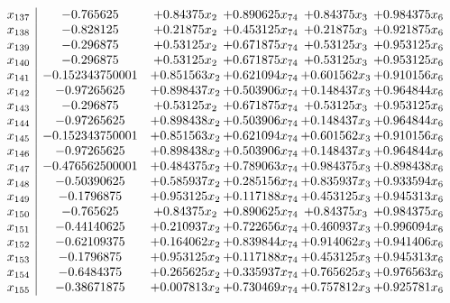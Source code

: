 \documentclass[11pt]{article}
\begin{document}
\[\begin{array}{c| c c@{\hskip 2pt} c@{\hskip 2pt} c@{\hskip 2pt} c@{\hskip 2pt} }
 x_{137}   &  -0.765625 & + 0.84375 x_{2} & + 0.890625 x_{74} & + 0.84375 x_{3} & + 0.984375 x_{6}\\
 x_{138}   &  -0.828125 & + 0.21875 x_{2} & + 0.453125 x_{74} & + 0.21875 x_{3} & + 0.921875 x_{6}\\
 x_{139}   &  -0.296875 & + 0.53125 x_{2} & + 0.671875 x_{74} & + 0.53125 x_{3} & + 0.953125 x_{6}\\
 x_{140}   &  -0.296875 & + 0.53125 x_{2} & + 0.671875 x_{74} & + 0.53125 x_{3} & + 0.953125 x_{6}\\
 x_{141}   &  -0.152343750001 & + 0.851563 x_{2} & + 0.621094 x_{74} & + 0.601562 x_{3} & + 0.910156 x_{6}\\
 x_{142}   &  -0.97265625 & + 0.898437 x_{2} & + 0.503906 x_{74} & + 0.148437 x_{3} & + 0.964844 x_{6}\\
 x_{143}   &  -0.296875 & + 0.53125 x_{2} & + 0.671875 x_{74} & + 0.53125 x_{3} & + 0.953125 x_{6}\\
 x_{144}   &  -0.97265625 & + 0.898438 x_{2} & + 0.503906 x_{74} & + 0.148437 x_{3} & + 0.964844 x_{6}\\
 x_{145}   &  -0.152343750001 & + 0.851563 x_{2} & + 0.621094 x_{74} & + 0.601562 x_{3} & + 0.910156 x_{6}\\
 x_{146}   &  -0.97265625 & + 0.898438 x_{2} & + 0.503906 x_{74} & + 0.148437 x_{3} & + 0.964844 x_{6}\\
 x_{147}   &  -0.476562500001 & + 0.484375 x_{2} & + 0.789063 x_{74} & + 0.984375 x_{3} & + 0.898438 x_{6}\\
 x_{148}   &  -0.50390625 & + 0.585937 x_{2} & + 0.285156 x_{74} & + 0.835937 x_{3} & + 0.933594 x_{6}\\
 x_{149}   &  -0.1796875 & + 0.953125 x_{2} & + 0.117188 x_{74} & + 0.453125 x_{3} & + 0.945313 x_{6}\\
 x_{150}   &  -0.765625 & + 0.84375 x_{2} & + 0.890625 x_{74} & + 0.84375 x_{3} & + 0.984375 x_{6}\\
 x_{151}   &  -0.44140625 & + 0.210937 x_{2} & + 0.722656 x_{74} & + 0.460937 x_{3} & + 0.996094 x_{6}\\
 x_{152}   &  -0.62109375 & + 0.164062 x_{2} & + 0.839844 x_{74} & + 0.914062 x_{3} & + 0.941406 x_{6}\\
 x_{153}   &  -0.1796875 & + 0.953125 x_{2} & + 0.117188 x_{74} & + 0.453125 x_{3} & + 0.945313 x_{6}\\
 x_{154}   &  -0.6484375 & + 0.265625 x_{2} & + 0.335937 x_{74} & + 0.765625 x_{3} & + 0.976563 x_{6}\\
 x_{155}   &  -0.38671875 & + 0.007813 x_{2} & + 0.730469 x_{74} & + 0.757812 x_{3} & + 0.925781 x_{6}\\

\end{array}\]
\end{document}
